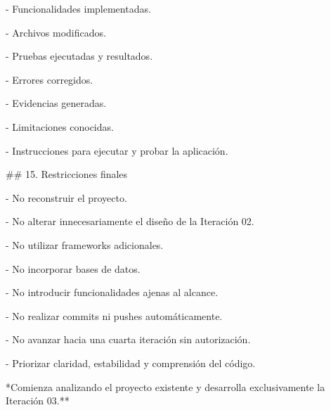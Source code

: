 \noindent - Funcionalidades implementadas.\par
\noindent - Archivos modificados.\par
\noindent - Pruebas ejecutadas y resultados.\par
\noindent - Errores corregidos.\par
\noindent - Evidencias generadas.\par
\noindent - Limitaciones conocidas.\par
\noindent - Instrucciones para ejecutar y probar la aplicación.\par
\par\smallskip
\noindent \#\# 15. Restricciones finales\par
\par\smallskip
\noindent - No reconstruir el proyecto.\par
\noindent - No alterar innecesariamente el diseño de la Iteración 02.\par
\noindent - No utilizar frameworks adicionales.\par
\noindent - No incorporar bases de datos.\par
\noindent - No introducir funcionalidades ajenas al alcance.\par
\noindent - No realizar commits ni pushes automáticamente.\par
\noindent - No avanzar hacia una cuarta iteración sin autorización.\par
\noindent - Priorizar claridad, estabilidad y comprensión del código.\par
\par\smallskip
\noindent **Comienza analizando el proyecto existente y desarrolla exclusivamente la Iteración 03.**\par
\endgroup
